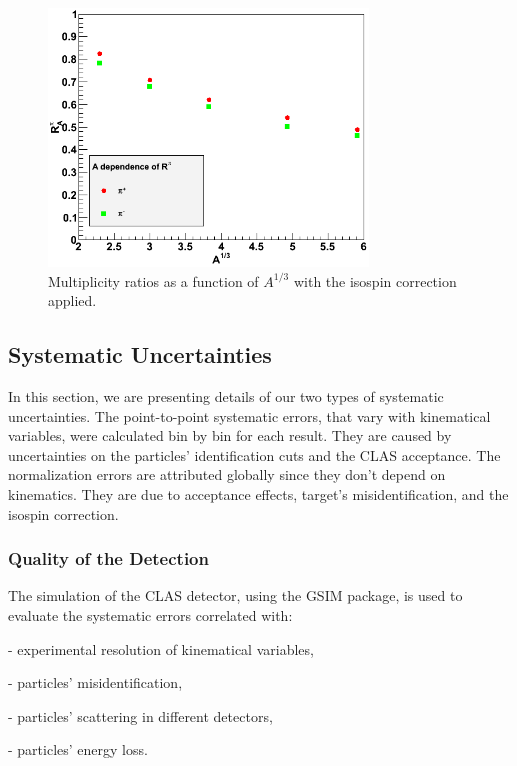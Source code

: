 \begin{figure}[tbp]
\centering
\includegraphics[width=8.5cm] {chap5-fig/c_RvA.png}
\caption {Multiplicity ratios as a function of $A^{1/3}$ with the isospin correction applied.}
\label{fig:IsoPlot}
\end{figure}

\subsection{Systematic Uncertainties}
\label{sec:TotSys}

In this section, we are presenting details of our two types of systematic uncertainties. The point-to-point systematic errors, that vary with kinematical variables, were calculated bin by bin for each result. They are caused by uncertainties on the particles' identification cuts and the CLAS acceptance. The normalization errors are attributed globally since they don't depend on kinematics. They are due to acceptance effects, target's misidentification, and the isospin correction.

\subsubsection{Quality of the Detection}
\label{SysId}

The simulation of the CLAS detector, using the GSIM package, is used 
to evaluate the systematic errors correlated with:

  - experimental resolution of kinematical variables,

  - particles' misidentification,

  - particles' scattering in different detectors,

  - particles' energy loss.\\


